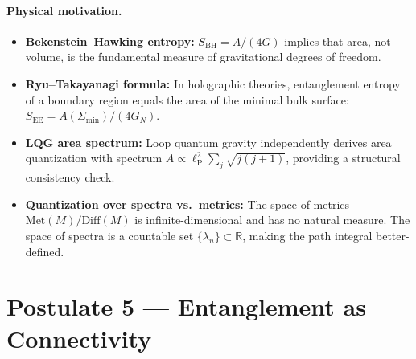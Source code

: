 \documentclass[12pt,a4paper]{article}
\theoremstyle{postulate}
\newcommand{\planck}{\ell_{\mathrm{P}}}
\begin{document}
\paragraph{Physical motivation.}
\begin{itemize}
  \item \textbf{Bekenstein--Hawking entropy:}\quad
        $S_{\mathrm{BH}} = A/(4G)$ implies that area, not volume, is the
        fundamental measure of gravitational degrees of freedom.
  \item \textbf{Ryu--Takayanagi formula:}\quad
        In holographic theories, entanglement entropy of a boundary region
        equals the area of the minimal bulk surface:
        $S_{\mathrm{EE}} = A(\Sigma_{\min})/(4G_N)$.
  \item \textbf{LQG area spectrum:}\quad
        Loop quantum gravity independently derives area quantization with
        spectrum $A \propto \planck^2 \sum_j \sqrt{j(j+1)}$, providing a
        structural consistency check.
  \item \textbf{Quantization over spectra vs.\ metrics:}\quad
        The space of metrics $\mathrm{Met}(M)/\mathrm{Diff}(M)$ is
        infinite-dimensional and has no natural measure.  The space of
        spectra is a countable set $\{\lambda_n\} \subset \mathbb{R}$,
        making the path integral better-defined.
\end{itemize}


\section{Postulate 5 --- Entanglement as Connectivity}\label{sec:P5}
\end{document}

